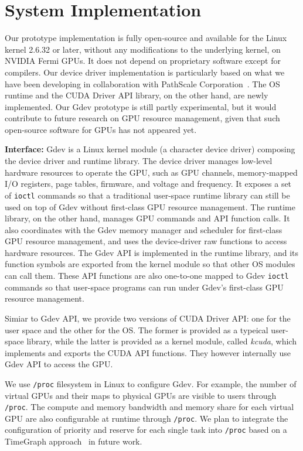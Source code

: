 \section{System Implementation}
\label{sec:implementation}

Our prototype implementation is fully open-source and available for the
Linux kernel 2.6.32 or later, without any modifications to the
underlying kernel, on NVIDIA Fermi GPUs.
It does not depend on proprietary software except for compilers.
Our device driver implementation is particularly based on what we have
been developing in collaboration with PathScale
Corporation~\cite{ENZO}.
The OS runtime and the CUDA Driver API library, on the other hand, are
newly implemented.
Our Gdev prototype is still partly experimental, but it would contribute
to future research on GPU resource management, given that such
open-source software for GPUs has not appeared yet.

\textbf{Interface:}
Gdev is a Linux kernel module (a character device driver) composing the
device driver and runtime library.
The device driver manages low-level hardware resources to operate the
GPU, such as GPU channels, memory-mapped I/O registers, page tables,
firmware, and voltage and frequency.
It exposes a set of \texttt{ioctl} commands so that a traditional
user-space runtime library can still be used on top of Gdev without 
first-class GPU resource management.
The runtime library, on the other hand, manages GPU commands and API
function calls.
It also coordinates with the Gdev memory manager and scheduler for
first-class GPU resource management, and uses
the device-driver raw functions to access hardware resources.
The Gdev API is implemented in the runtime library, and its function
symbols are exported from the kernel module so that other OS modules can
call them.
These API functions are also one-to-one mapped to Gdev \texttt{ioctl}
commands so that user-space programs can run under Gdev's first-class
GPU resource management.

Simiar to Gdev API, we provide two versions of CUDA Driver API: one for
the user space and the other for the OS.
The former is provided as a typeical user-space library, while the
latter is provided as a kernel module, called \textit{kcuda},
which implements and exports the CUDA API functions.
They however internally use Gdev API to access the GPU.

We use \texttt{/proc} filesystem in Linux to configure Gdev.
For example, the number of virtual GPUs and their maps to physical GPUs
are visible to users through \texttt{/proc}.
The compute and memory bandwidth and memory share for each virtual GPU
are also configurable at runtime through \texttt{/proc}.
We plan to integrate the configuration of priority and reserve for
each single task into \texttt{/proc} based on a TimeGraph
approach~\cite{Kato_ATC11} in future work.

